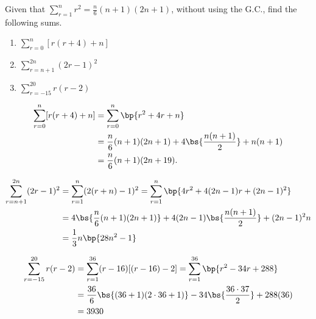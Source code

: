 \begin{problem}
    Given that $\sum_{r=1}^n r^2 = \frac{n}6 (n+1)(2n+1)$, without using the G.C., find the following sums.

    \begin{enumerate}
        \item $\sum_{r=0}^n [r(r+4) + n]$
        \item $\sum_{r=n+1}^{2n} (2r-1)^2$
        \item $\sum_{r=-15}^{20} r(r-2)$
    \end{enumerate}
\end{problem}
\begin{solution}
    \begin{ppart}
        \begin{align*}
            \sum_{r=0}^n [r(r+4) + n] &= \sum_{r=0}^n \bp{r^2 + 4r + n}\\
            &= \frac{n}6 (n+1)(2n+1) + 4\bs{\frac{n(n+1)}2} + n(n+1)\\
            &= \frac{n}6 (n+1)(2n+19).
        \end{align*}
    \end{ppart}
    \begin{ppart}
        \begin{align*}
            \sum_{r=n+1}^{2n} (2r-1)^2 &= \sum_{r=1}^{n} (2(r+n)-1)^2 = \sum_{r=1}^{n} \bp{4r^2 + 4(2n-1)r + (2n-1)^2}\\
            &= 4\bs{\frac{n}6 (n+1)(2n+1)} + 4(2n-1)\bs{\frac{n(n+1)}2} + (2n-1)^2 n \\
            &= \frac13 n \bp{28n^2 -1 }
        \end{align*}
    \end{ppart}
    \begin{ppart}
        \begin{align*}
            \sum_{r=-15}^{20} r(r-2) &= \sum_{r=1}^{36} (r-16)[(r-16)-2] = \sum_{r=1}^{36} \bp{r^2 - 34r + 288}\\
            &= \frac{36}6 \bs{(36+1)(2\cdot36 + 1)} - 34 \bs{\frac{36 \cdot 37}2} + 288(36)\\
            &= 3930
        \end{align*}
    \end{ppart}
\end{solution}

